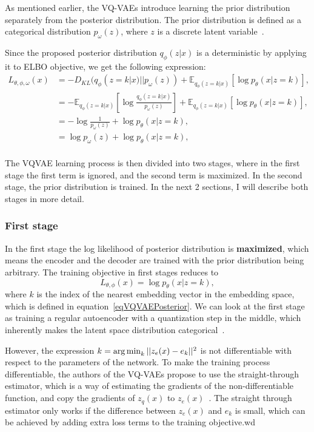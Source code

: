 As mentioned earlier, the VQ-VAEs introduce learning the prior distribution separately from the posterior distribution. The prior distribution is defined as a categorical distribution $p_{\omega}(z)$, where $z$ is a discrete latent variable~\cite{vqvae}.

Since the proposed posterior distribution $q_{\phi}(z|x)$ is a deterministic by applying it to ELBO objective, we get the following expression:
\begin{equation}
    \begin{split}
        L_{\theta, \phi, \omega}(x) &= - D_{KL}(q_{\phi}(z = k|x) || p_{\omega}(z)) + \mathbb{E}_{q_{\phi}(z=k|x)} [\log p_{\theta}(x|z = k)],\\
                            &= - \mathbb{E}_{q_{\phi}(z=k|x)} [\log \frac{q_{\phi}(z=k|x)}{p_{\omega}(z)}] + \mathbb{E}_{q_{\phi}(z=k|x)} [\log p_{\theta}(x|z = k)],\\
                            &= - \log \frac{1}{p_{\omega}(z)} + \log p_{\theta}(x|z = k),\\
                            &= \log p_{\omega}(z) + \log p_{\theta}(x|z = k),\\
    \end{split}
\end{equation}

The VQVAE learning process is then divided into two stages, where in the first stage the first term is ignored, and the second term is maximized. In the second stage, the prior distribution is trained. In the next 2 sections, I will describe both stages in more detail.

\subsubsection{First stage}

In the first stage the log likelihood of posterior distribution is \textbf{maximized}, which means the encoder and the decoder are trained with the prior distribution being arbitrary. The training objective in first stages reduces to 
\[ L_{\theta, \phi}(x) = \log p_{\theta}(x|z = k), \]
where $k$ is the index of the nearest embedding vector in the embedding space, which is defined in equation~\ref{eqVQVAEPosterior}. We can look at the first stage as training a regular autoencoder with a quantization step in the middle, which inherently makes the latent space distribution categorical~\cite{vqvae}.
    
However, the expression $k = \operatorname*{arg\,min}_{k} || z_e(x) - e_k ||^2$ is not differentiable with respect to the parameters of the network. To make the training process differentiable, the authors of the VQ-VAEs propose to use the straight-through estimator, which is a way of estimating the gradients of the non-differentiable function, and copy the gradients of $z_q(x)$ to $z_e(x)$~\cite{vqvae}. The straight through estimator only works if the difference between $z_e(x)$ and $e_k$ is small, which can be achieved by adding extra loss terms to the training objective.wd\cite{straight_through}

